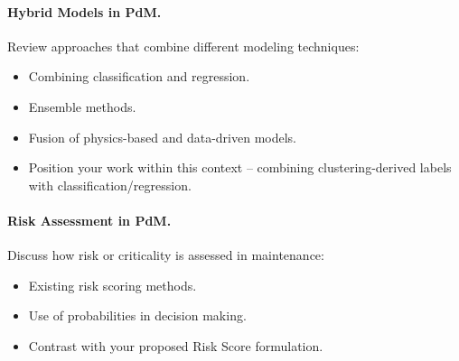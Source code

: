 \paragraph{Hybrid Models in PdM.}
Review approaches that combine different modeling techniques:
\begin{itemize}
    \item Combining classification and regression.
    \item Ensemble methods.
    \item Fusion of physics-based and data-driven models.
    \item Position your work within this context – combining clustering-derived labels with classification/regression.
\end{itemize}

\paragraph{Risk Assessment in PdM.}
Discuss how risk or criticality is assessed in maintenance:
\begin{itemize}
    \item Existing risk scoring methods.
    \item Use of probabilities in decision making.
    \item Contrast with your proposed Risk Score formulation.
\end{itemize}



